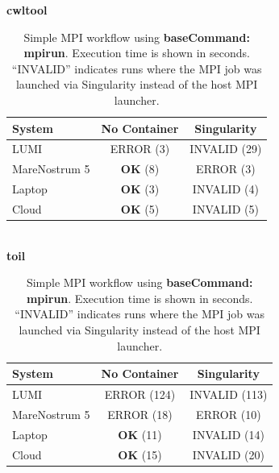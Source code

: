 \documentclass{article}
\begin{document}
\begin{table}[ht!]
\centering
\renewcommand{\arraystretch}{1.2}
\textbf{cwltool}\\[0.2cm]
\begin{tabular}{|l|c|c|}
\hline
\rowcolor{lightgray!50}
\textbf{System} & \textbf{No Container} & \textbf{Singularity} \\
\hline
LUMI & ERROR (3) & INVALID (29) \\
MareNostrum 5 & \textbf{OK} (8) & ERROR (3) \\
Laptop & \textbf{OK} (3) & INVALID (4) \\
Cloud & \textbf{OK} (5) & INVALID (5) \\
\hline
\end{tabular}
\\[0.6cm]
\textbf{toil}\\[0.2cm]
\begin{tabular}{|l|c|c|}
\hline
\rowcolor{lightgray!50}
\textbf{System} & \textbf{No Container} & \textbf{Singularity} \\
\hline
LUMI & ERROR (124) & INVALID (113) \\
MareNostrum 5 & ERROR (18) & ERROR (10) \\
Laptop & \textbf{OK} (11) & INVALID (14) \\
Cloud & \textbf{OK} (15) & INVALID (20) \\
\hline
\end{tabular}
\\[0.6cm]
\caption{Simple MPI workflow using \protect\textbf{baseCommand: mpirun}. Execution time is shown in seconds. “INVALID” indicates runs where the MPI job was launched via Singularity instead of the host MPI launcher.}
\label{table:workflow-base}
\end{table}
\end{document}
